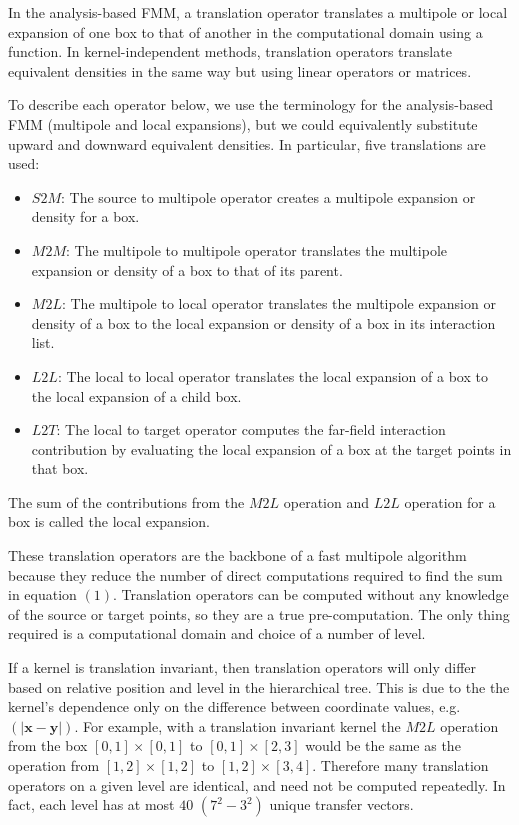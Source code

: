 \documentclass[11pt, oneside]{article}   	%
\begin{document}
In the analysis-based FMM, a translation operator translates a multipole or local expansion of one box to that of another in the computational domain using a function. In kernel-independent methods, translation operators translate equivalent densities in the same way but using linear operators or matrices.

To describe each operator below, we use the terminology for the analysis-based FMM (multipole and local expansions), but we could equivalently substitute upward and downward equivalent densities. In particular, five translations are used:

\begin{itemize}
\item $S2M$: The source to multipole operator creates a multipole expansion or density for a box.

\item $M2M$: The multipole to multipole operator translates the multipole expansion or density of a box to that of its parent.

\item $M2L$: The multipole to local operator translates the multipole expansion or density of a box to the local expansion or density of a box in its interaction list.

\item $L2L$: The local to local operator translates the local expansion of a box to the local expansion of a child box.

\item $L2T$: The local to target operator computes the far-field interaction contribution by evaluating the local expansion of a box at the target points in that box.
\end{itemize}

The sum of the contributions from the $M2L$ operation and $L2L$ operation for a box is called the local expansion.

These translation operators are the backbone of a fast multipole algorithm because they reduce the number of direct computations required to find the sum in equation $(1)$. Translation operators can be computed without any knowledge of the source or target points, so they are a true pre-computation. The only thing required is a computational domain and choice of a number of level.

If a kernel is translation invariant, then translation operators will only differ based on relative position and level in the hierarchical tree. This is due to the the kernel's dependence only on the difference between coordinate values, e.g. $(|\mathbf{x}-\mathbf{y}|)$. For example, with a translation invariant kernel the $M2L$ operation from the box $[0,1]\times[0,1]$ to $[0,1]\times[2,3]$ would be the same as the operation from $[1,2]\times[1,2]$ to $[1,2]\times[3,4]$. Therefore many translation operators on a given level are identical, and need not be computed repeatedly. In fact, each level has at most $40$ $(7^2-3^2)$ unique transfer vectors.
\end{document}
